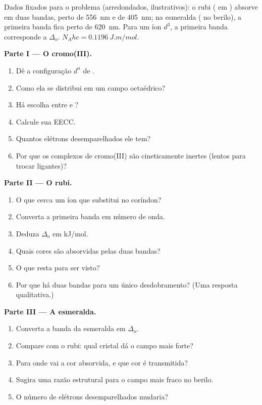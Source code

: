 \begin{problem}
\label{pb:b2:ligand-field:1}
Dados fixados para o problema (arredondados, ilustrativos): o rubi ( em
) absorve em duas bandas, perto de \qty{556}{nm} e de \qty{405}{nm}; na
esmeralda ( no berilo), a primeira banda fica perto de \qty{620}{nm}.
Para um íon $d^3$, a primeira banda corresponde a
$\Delta_o$. $N_Ahc = \qty{0.1196}{J.m/mol}$.

\medskip
\noindent\textbf{Parte I --- O cromo(III).}
\begin{enumerate}
  \item Dê a configuração $d^n$ de .
  \item Como ela se distribui em um campo octaédrico?
  \item Há escolha entre  e ?
  \item Calcule sua EECC.
  \item Quantos elétrons desemparelhados ele tem?
  \item Por que os complexos de cromo(III) são cineticamente inertes (lentos
        para trocar ligantes)?
\end{enumerate}

\medskip
\noindent\textbf{Parte II --- O rubi.}
\begin{enumerate}[resume]
  \item O que cerca um íon  que substitui  no coríndon?
  \item Converta a primeira banda em número de onda.
  \item Deduza $\Delta_o$ em \unit{kJ/mol}.
  \item Quais cores são absorvidas pelas duas bandas?
  \item O que resta para ser visto?
  \item Por que há duas bandas para um único desdobramento? (Uma resposta qualitativa.)
\end{enumerate}

\medskip
\noindent\textbf{Parte III --- A esmeralda.}
\begin{enumerate}[resume]
  \item Converta a banda da esmeralda em $\Delta_o$.
  \item Compare com o rubi: qual cristal dá o campo mais forte?
  \item Para onde vai a cor absorvida, e que cor é transmitida?
  \item Sugira uma razão estrutural para o campo mais fraco no berilo.
  \item O número de elétrons desemparelhados mudaria?
\end{enumerate}


\end{problem}
